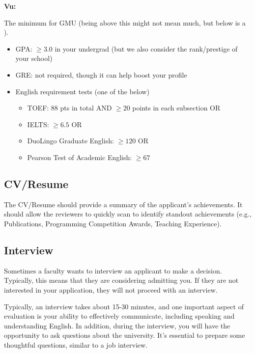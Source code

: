 \documentclass[11pt]{article}
\newenvironment{commentbox}[1][]{
\small
    \begin{cbox}
    \textbf{#1} 
 }{
   \end{cbox}
}
\newcommand{\red}[1]{{\color{red}{#1}}}
\begin{document}
\begin{commentbox}[Vu:]
The minimum for GMU (being above this might not mean much, but below is a \red{red flag}).
\begin{itemize}
\item GPA: $\ge 3.0$ in your undergrad (but we also consider the rank/prestige of your school)
\item GRE: not required, though it can help boost your profile
\item English requirement tests (one of the below)
  \begin{itemize}    
  \item TOEF: 88 pts in total AND $\ge 20$ points in each subsection OR
  \item IELTS: $\ge 6.5$ OR
  \item DuoLingo Graduate English: $\ge 120$ OR 
  \item Pearson Test of Academic English: $\ge 67$
  \end{itemize}  
\end{itemize}
\end{commentbox}


\subsection{CV/Resume}
The CV/Resume should provide a summary of the applicant's achievements.  It should allow the reviewers to quickly scan to identify standout achievements (e.g., Publications, Programming Competition Awards, Teaching Experience).

\subsection{Interview}
Sometimes a faculty wants to interview an applicant to make a decision. Typically, this means that they are considering admitting you. If they are not interested in your application, they will not proceed with an interview. 

Typically, an interview takes about 15-30 minutes, and one important aspect of evaluation is your ability to effectively communicate, including speaking and understanding English. In addition, during the interview, you will have the opportunity to ask questions about the university. It's essential to prepare some thoughtful questions, similar to a job interview.
\end{document}
